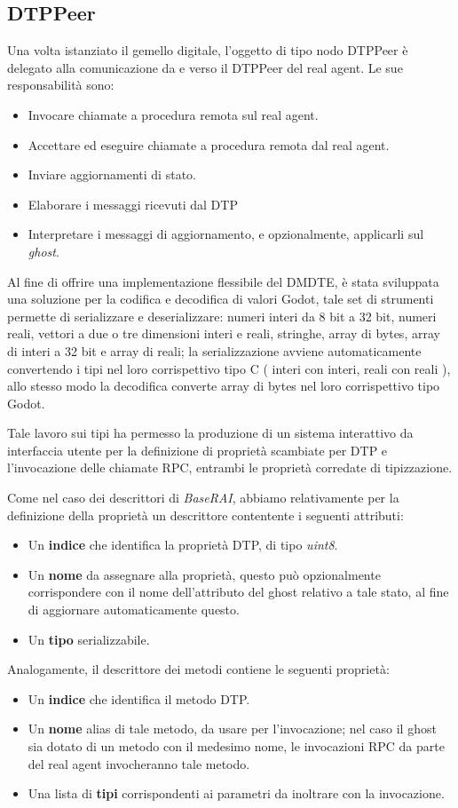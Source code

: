 \subsection*{DTPPeer}
Una volta istanziato il gemello digitale, l'oggetto di tipo nodo DTPPeer è delegato alla comunicazione da e verso il DTPPeer del real agent. Le sue responsabilità sono:

\begin{itemize}
	\item Invocare chiamate a procedura remota sul real agent.
	\item Accettare ed eseguire chiamate a procedura remota dal real agent.
	\item Inviare aggiornamenti di stato.
	\item Elaborare i messaggi ricevuti dal DTP
	\item Interpretare i messaggi di aggiornamento, e opzionalmente, applicarli sul \textit{ghost}.
\end{itemize}

Al fine di offrire una implementazione flessibile del DMDTE, è stata sviluppata una soluzione per la codifica e decodifica di valori Godot, tale set di strumenti permette di serializzare e deserializzare: numeri interi da 8 bit a 32 bit, numeri reali, vettori a due o tre dimensioni interi e reali, stringhe, array di bytes, array di interi a 32 bit e array di reali; la serializzazione avviene automaticamente convertendo i tipi nel loro corrispettivo tipo C ( interi con interi, reali con reali ), allo stesso modo la decodifica converte array di bytes nel loro corrispettivo tipo Godot.

Tale lavoro sui tipi ha permesso la produzione di un sistema interattivo da interfaccia utente per la definizione di proprietà scambiate per DTP e l'invocazione delle chiamate RPC, entrambi le proprietà corredate di tipizzazione.

Come nel caso dei descrittori di \textit{BaseRAI}, abbiamo relativamente per la definizione della proprietà un descrittore contentente i seguenti attributi:
\begin{itemize}
	\item Un \textbf{indice} che identifica la proprietà DTP, di tipo \textit{uint8}.
	\item Un \textbf{nome} da assegnare alla proprietà, questo può opzionalmente corrispondere con il nome dell'attributo del ghost relativo a tale stato, al fine di aggiornare automaticamente questo.
	\item Un \textbf{tipo} serializzabile.
\end{itemize}
Analogamente, il descrittore dei metodi contiene le seguenti proprietà:
\begin{itemize}
	\item Un \textbf{indice} che identifica il metodo DTP.
	\item Un \textbf{nome} alias di tale metodo, da usare per l'invocazione; nel caso il ghost sia dotato di un metodo con il medesimo nome, le invocazioni RPC da parte del real agent invocheranno tale metodo.
	\item Una lista di \textbf{tipi} corrispondenti ai parametri da inoltrare con la invocazione.
\end{itemize}

